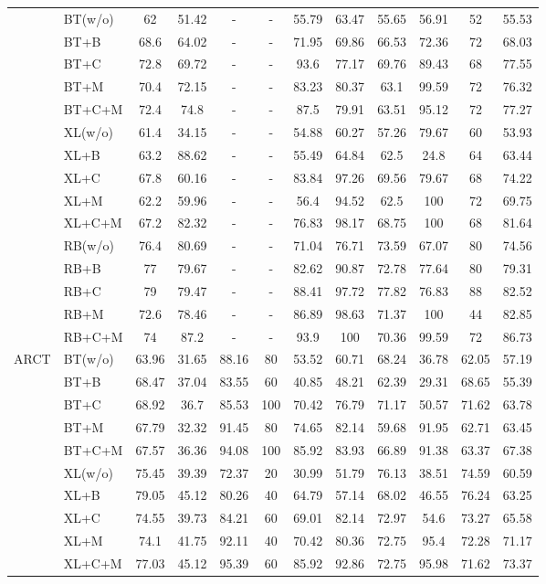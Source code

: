 \documentclass[11pt,a4paper]{article}
\begin{document}
\begin{table}[th]
\begin{tabular}{ll|c|ccccccccc}
& 		    BT(w/o)&62&51.42&-&-&55.79&63.47&55.65&56.91&52&55.53 \\
&BT+B&68.6&64.02&-&-&71.95&69.86&66.53&72.36&72&68.03 \\
&BT+C&72.8&69.72&-&-&93.6&77.17&69.76&89.43&68&77.55 \\
&BT+M&70.4&72.15&-&-&83.23&80.37&63.1&99.59&72&76.32 \\
&BT+C+M&72.4&74.8&-&-&87.5&79.91&63.51&95.12&72&77.27 \\
\cline{2-12}
&XL(w/o)&61.4&34.15&-&-&54.88&60.27&57.26&79.67&60&53.93 \\
&XL+B&63.2&88.62&-&-&55.49&64.84&62.5&24.8&64&63.44 \\
&XL+C&67.8&60.16&-&-&83.84&97.26&69.56&79.67&68&74.22 \\
&XL+M&62.2&59.96&-&-&56.4&94.52&62.5&100&72&69.75 \\
&XL+C+M&67.2&82.32&-&-&76.83&98.17&68.75&100&68&81.64 \\
\cline{2-12}
&RB(w/o)&76.4&80.69&-&-&71.04&76.71&73.59&67.07&80&74.56 \\
&RB+B&77&79.67&-&-&82.62&90.87&72.78&77.64&80&79.31 \\
&RB+C&79&79.47&-&-&88.41&97.72&77.82&76.83&88&82.52 \\
&RB+M&72.6&78.46&-&-&86.89&98.63&71.37&100&44&82.85 \\
&RB+C+M&74&87.2&-&-&93.9&100&70.36&99.59&72&86.73 \\
	\hline
\multirow{15}{*}{ARCT} 
 		&BT(w/o)&63.96&31.65&88.16&80&53.52&60.71&68.24&36.78&62.05&57.19 \\ 
&BT+B&68.47&37.04&83.55&60&40.85&48.21&62.39&29.31&68.65&55.39 \\ 
&BT+C&68.92&36.7&85.53&100&70.42&76.79&71.17&50.57&71.62&63.78 \\ 
&BT+M&67.79&32.32&91.45&80&74.65&82.14&59.68&91.95&62.71&63.45 \\ 
&BT+C+M&67.57&36.36&94.08&100&85.92&83.93&66.89&91.38&63.37&67.38 \\ 
\cline{2-12} 
&XL(w/o)&75.45&39.39&72.37&20&30.99&51.79&76.13&38.51&74.59&60.59 \\ 
&XL+B&79.05&45.12&80.26&40&64.79&57.14&68.02&46.55&76.24&63.25 \\ 
&XL+C&74.55&39.73&84.21&60&69.01&82.14&72.97&54.6&73.27&65.58 \\ 
&XL+M&74.1&41.75&92.11&40&70.42&80.36&72.75&95.4&72.28&71.17 \\ 
&XL+C+M&77.03&45.12&95.39&60&85.92&92.86&72.75&95.98&71.62&73.37 \\ 

\end{tabular}
\end{table}
\end{document}
